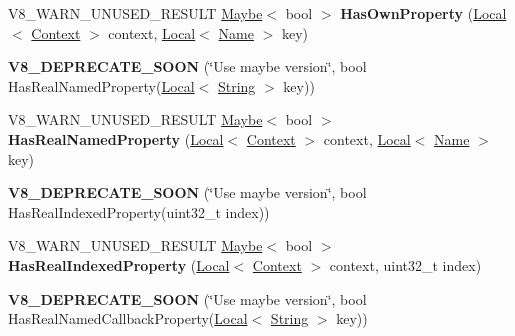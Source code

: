 \begin{DoxyCompactItemize}
\item 
V8\+\_\+\+W\+A\+R\+N\+\_\+\+U\+N\+U\+S\+E\+D\+\_\+\+R\+E\+S\+U\+LT \hyperlink{classv8_1_1_maybe}{Maybe}$<$ bool $>$ {\bfseries Has\+Own\+Property} (\hyperlink{classv8_1_1_local}{Local}$<$ \hyperlink{classv8_1_1_context}{Context} $>$ context, \hyperlink{classv8_1_1_local}{Local}$<$ \hyperlink{classv8_1_1_name}{Name} $>$ key)\hypertarget{classv8_1_1_object_a8c93259552d0a54debffc95895b4f558}{}\label{classv8_1_1_object_a8c93259552d0a54debffc95895b4f558}

\item 
{\bfseries V8\+\_\+\+D\+E\+P\+R\+E\+C\+A\+T\+E\+\_\+\+S\+O\+ON} (\char`\"{}Use maybe version\char`\"{}, bool Has\+Real\+Named\+Property(\hyperlink{classv8_1_1_local}{Local}$<$ \hyperlink{classv8_1_1_string}{String} $>$ key))\hypertarget{classv8_1_1_object_abf24b52a108c801a74718e1a1e64ba5b}{}\label{classv8_1_1_object_abf24b52a108c801a74718e1a1e64ba5b}

\item 
V8\+\_\+\+W\+A\+R\+N\+\_\+\+U\+N\+U\+S\+E\+D\+\_\+\+R\+E\+S\+U\+LT \hyperlink{classv8_1_1_maybe}{Maybe}$<$ bool $>$ {\bfseries Has\+Real\+Named\+Property} (\hyperlink{classv8_1_1_local}{Local}$<$ \hyperlink{classv8_1_1_context}{Context} $>$ context, \hyperlink{classv8_1_1_local}{Local}$<$ \hyperlink{classv8_1_1_name}{Name} $>$ key)\hypertarget{classv8_1_1_object_a305a692fa4a571a41755520b6344fa1c}{}\label{classv8_1_1_object_a305a692fa4a571a41755520b6344fa1c}

\item 
{\bfseries V8\+\_\+\+D\+E\+P\+R\+E\+C\+A\+T\+E\+\_\+\+S\+O\+ON} (\char`\"{}Use maybe version\char`\"{}, bool Has\+Real\+Indexed\+Property(uint32\+\_\+t index))\hypertarget{classv8_1_1_object_abd04e5cb82426a70ebea6afec8687c9e}{}\label{classv8_1_1_object_abd04e5cb82426a70ebea6afec8687c9e}

\item 
V8\+\_\+\+W\+A\+R\+N\+\_\+\+U\+N\+U\+S\+E\+D\+\_\+\+R\+E\+S\+U\+LT \hyperlink{classv8_1_1_maybe}{Maybe}$<$ bool $>$ {\bfseries Has\+Real\+Indexed\+Property} (\hyperlink{classv8_1_1_local}{Local}$<$ \hyperlink{classv8_1_1_context}{Context} $>$ context, uint32\+\_\+t index)\hypertarget{classv8_1_1_object_ab5406f985e576ac1d45b844197c3ef84}{}\label{classv8_1_1_object_ab5406f985e576ac1d45b844197c3ef84}

\item 
{\bfseries V8\+\_\+\+D\+E\+P\+R\+E\+C\+A\+T\+E\+\_\+\+S\+O\+ON} (\char`\"{}Use maybe version\char`\"{}, bool Has\+Real\+Named\+Callback\+Property(\hyperlink{classv8_1_1_local}{Local}$<$ \hyperlink{classv8_1_1_string}{String} $>$ key))\hypertarget{classv8_1_1_object_ae1ffb11a0fa7549652d0530c0c4c4ca6}{}\label{classv8_1_1_object_ae1ffb11a0fa7549652d0530c0c4c4ca6}


\end{DoxyCompactItemize}
